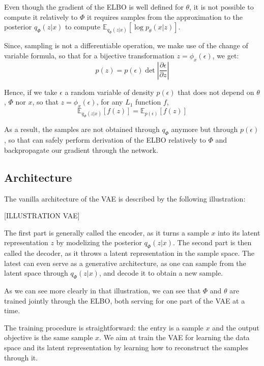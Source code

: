 Even though the gradient of the ELBO is well defined for $\theta$, it is not possible to compute it relatively to $\Phi$ it requires samples from the approximation to the posterior $q_{\Phi}(z|x)$ to compute $\mathbb{E}_{q_{\Phi}(z|x)}[\log p_{\theta}(x|z)]$. 

Since, sampling is not a differentiable operation, we make use of the change of variable formula, so that for a bijective transformation $z = \phi_x(\epsilon)$, we get:
$$
p(z) = p(\epsilon) \det \left| \frac{\partial \epsilon}{\partial z}\right|
$$

Hence, if we take $\epsilon$ a random variable of density $p(\epsilon)$ that does not depend on $\theta$, $\Phi$ nor $x$, so that $z = \phi_x(\epsilon)$, for any $L_1$ function $f$,
$$
\mathbb{E}_{q_{\Phi}(z|x)}[f(z)] = \mathbb{E}_{p(\epsilon)}[f(z)]
$$

As a result, the samples are not obtained through $q_{\Phi}$ anymore but through $p(\epsilon)$, so that can safely perform derivation of the ELBO relatively to $\Phi$ and backpropagate our gradient through the network.

\subsection{Architecture}

The vanilla architecture of the VAE is described by the following illustration:

[ILLUSTRATION VAE]

The first part is generally called the encoder, as it turns a sample $x$ into its latent representation $z$ by modelizing the posterior $q_{\Phi}(z|x)$. The second part is then called the decoder, as it throws a latent representation in the sample space. The latest can even serve as a generative architecture, as one can sample from the latent space through $q_{\Phi}(z|x)$, and decode it to obtain a new sample.

As we can see more clearly in that illustration, we can see that $\Phi$ and $\theta$ are trained jointly through the ELBO, both serving for one part of the VAE at a time.

The training procedure is straightforward: the entry is a sample $x$ and the output objective is the same sample $x$. We aim at train the VAE for learning the data space and its latent representation by learning how to reconstruct the samples through it.



